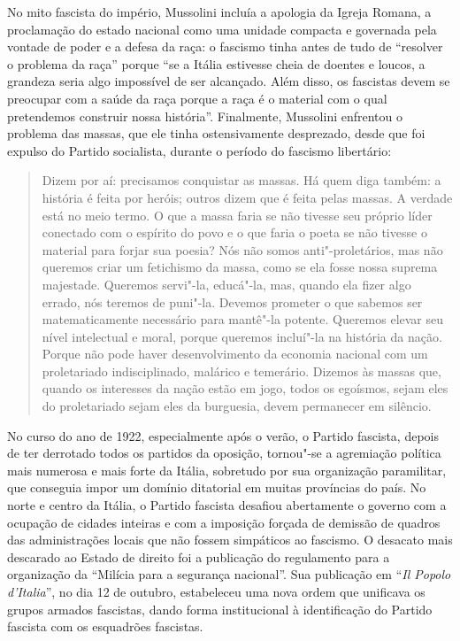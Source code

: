 No mito fascista do império, Mussolini incluía a apologia da Igreja
Romana, a proclamação do estado nacional como uma unidade compacta e
governada pela vontade de poder e a defesa da raça: o fascismo tinha
antes de tudo de ``resolver o problema da raça'' porque ``se a Itália
estivesse cheia de doentes e loucos, a grandeza seria algo impossível de
ser alcançado. Além disso, os fascistas devem se preocupar com a saúde
da raça porque a raça é o material com o qual pretendemos construir
nossa história''. Finalmente, Mussolini enfrentou o problema das massas,
que ele tinha ostensivamente desprezado, desde que foi expulso do
Partido socialista, durante o período do fascismo libertário:

\begin{quote}
Dizem por aí: precisamos conquistar as massas. Há quem diga também: a
história é feita por heróis; outros dizem que é feita pelas massas. A
verdade está no meio termo. O que a massa faria se não tivesse seu
próprio líder conectado com o espírito do povo e o que faria o poeta se
não tivesse o material para forjar sua poesia? Nós não somos
anti"-proletários, mas não queremos criar um fetichismo da massa, como se
ela fosse nossa suprema majestade. Queremos servi"-la, educá"-la, mas,
quando ela fizer algo errado, nós teremos de puni"-la. Devemos prometer o
que sabemos ser matematicamente necessário para mantê"-la potente.
Queremos elevar seu nível intelectual e moral, porque queremos incluí"-la
na história da nação. Porque não pode haver desenvolvimento da economia
nacional com um proletariado indisciplinado, malárico e temerário.
Dizemos às massas que, quando os interesses da nação estão em jogo,
todos os egoísmos, sejam eles do proletariado sejam eles da burguesia,
devem permanecer em silêncio.
\end{quote}

No curso do ano de 1922, especialmente após o verão, o Partido fascista,
depois de ter derrotado todos os partidos da oposição, tornou"-se a
agremiação política mais numerosa e mais forte da Itália, sobretudo por
sua organização paramilitar, que conseguia impor um domínio ditatorial
em muitas províncias do país. No norte e centro da Itália, o Partido
fascista desafiou abertamente o governo com a ocupação de cidades
inteiras e com a imposição forçada de demissão de quadros das
administrações locais que não fossem simpáticos ao fascismo. O desacato
mais descarado ao Estado de direito foi a publicação do regulamento para
a organização da ``Milícia para a segurança nacional''. Sua publicação em
``\emph{Il Popolo d'Italia}'', no dia 12 de outubro, estabeleceu uma nova
ordem que unificava os grupos armados fascistas, dando forma
institucional à identificação do Partido fascista com os esquadrões
fascistas.

